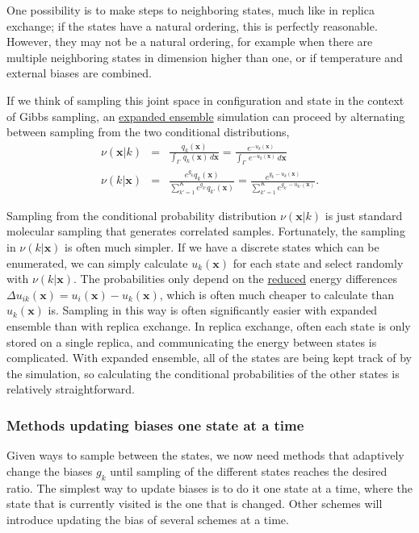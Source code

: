 \documentclass[9pt,review]{livecoms}
\newcommand{\vx}{\mathbf{x}}
\begin{document}
One possibility is to make steps to neighboring states, much like in replica exchange; if the states have a natural ordering, this is perfectly reasonable. However, they may not be a natural ordering, for example when there are multiple neighboring states in dimension higher than one, or if temperature and external biases are combined.

If we think of sampling this joint space in configuration and state in the context of Gibbs sampling, an \hyperlink{ref:ExpEns} {expanded ensemble} simulation can proceed by alternating between sampling from the two conditional distributions,
\begin{eqnarray}
\nu(\vx | k) &=& \frac{q_k(\vx)}{\int_\Gamma  \, q_k(\vx) \, d\vx}  = \frac{e^{-u_k(\vx)}}{\int_\Gamma  \, e^{-u_k(\vx)} \, d\vx }  \\
\nu(k | \vx) &=& \frac{e^{g_k}q_k(\vx)}{\sum\limits_{k'=1}^K e^{g_{k'}}q_{k'}(\vx)} = \frac{e^{g_k - u_k(\vx)}}{\sum\limits_{k'=1}^K e^{g_{k'} - u_{k'}(\vx)}} .\label{equation:expanded-ensemble-gibbs-update}
\end{eqnarray}

Sampling from the conditional probability distribution
$\nu(\vx | k)$ is just standard molecular sampling that generates correlated samples. Fortunately, the sampling in $\nu(k | \vx)$ is often much simpler.   If we have a
discrete states which can be enumerated, we can simply calculate
$u_k(\vx)$ for each state and select randomly with $\nu(k|\vx)$.  The
probabilities only depend on the \hyperlink{ref:reduced} {reduced} energy differences $\Delta
u_{ik}(\vx) = u_i(\vx) - u_k(\vx)$, which is often much cheaper to calculate
than $u_k(\vx)$ is. Sampling in this way is often significantly easier with expanded ensemble than with replica exchange. In replica exchange, often each state is only stored on a single replica, and communicating the energy between states is complicated. With expanded ensemble, all of the states are being kept track of by the simulation, so calculating the conditional probabilities of the other states is relatively straightforward.

\subsubsection{\label{sec:singlestate} Methods updating biases one state at a time}
Given ways to sample between the states, we now need methods that adaptively change the biases $g_k$ until sampling of the different states reaches the desired ratio. The simplest way to update biases is to do it one state at a time, where the state that is currently visited is the one that is changed. Other schemes will introduce updating the bias of several schemes at a time.
\end{document}
